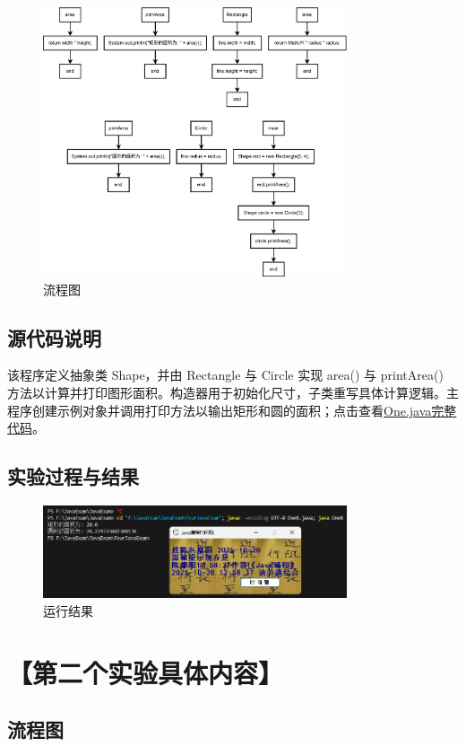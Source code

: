\documentclass[12pt,a4paper]{article}
\begin{document}
\begin{figure}[H]
\centering
\includegraphics[width=0.8\textwidth]{oneb1.png}
\caption{流程图}
\end{figure}

\subsection*{源代码说明}
该程序定义抽象类 Shape，并由 Rectangle 与 Circle 实现 area() 与 printArea() 方法以计算并打印图形面积。构造器用于初始化尺寸，子类重写具体计算逻辑。主程序创建示例对象并调用打印方法以输出矩形和圆的面积；点击查看\hyperref[sec:one]{One.java完整代码}。

\subsection*{实验过程与结果}

\begin{figure}[H]
\centering
\includegraphics[width=0.8\textwidth]{oneb.png}
\caption{运行结果}
\end{figure}

\section*{【第二个实验具体内容】}
\subsection*{流程图}
\end{document}
